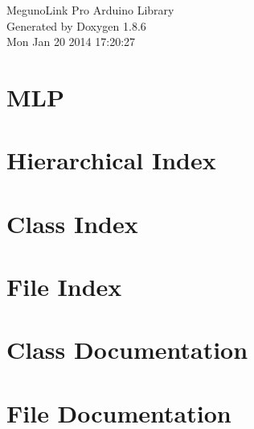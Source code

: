 \documentclass[twoside]{book}
\newcommand{\clearemptydoublepage}{%
  \newpage{\pagestyle{empty}\cleardoublepage}%
}
\begin{document}
\hypersetup{pageanchor=false}
\begin{titlepage}
\vspace*{7cm}
\begin{center}%
{\Large Meguno\-Link Pro Arduino Library }\\
\vspace*{1cm}
{\large Generated by Doxygen 1.8.6}\\
\vspace*{0.5cm}
{\small Mon Jan 20 2014 17:20:27}\\
\end{center}
\end{titlepage}
\clearemptydoublepage
\tableofcontents
\clearemptydoublepage
{}
\hypersetup{pageanchor=true}

\chapter{M\-L\-P}
\label{md___dropbox__arduino_development__git_hub__m_l_p__r_e_a_d_m_e}
\hypertarget{md___dropbox__arduino_development__git_hub__m_l_p__r_e_a_d_m_e}{}

\chapter{Hierarchical Index}

\chapter{Class Index}

\chapter{File Index}

\chapter{Class Documentation}








\chapter{File Documentation}



















\newpage
{}
{}
\printindex
\end{document}
